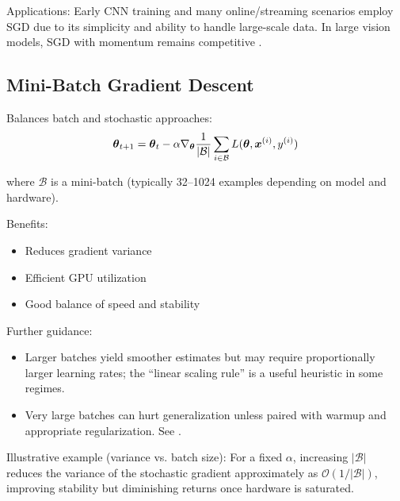 Applications: Early CNN training and many online/streaming scenarios employ SGD due to its simplicity and ability to handle large-scale data. In large vision models, SGD with momentum remains competitive \cite{He2016}.

\subsection{Mini-Batch Gradient Descent}

Balances batch and stochastic approaches:
\begin{equation}
\boldsymbol{\theta}_{t+1} = \boldsymbol{\theta}_t - \alpha \nabla_{\boldsymbol{\theta}} \frac{1}{|\mathcal{B}|} \sum_{i \in \mathcal{B}} L(\boldsymbol{\theta}, \boldsymbol{x}^{(i)}, y^{(i)})
\end{equation}

where $\mathcal{B}$ is a mini-batch (typically 32–1024 examples depending on model and hardware).

Benefits:
\begin{itemize}
    \item Reduces gradient variance
    \item Efficient GPU utilization
    \item Good balance of speed and stability
\end{itemize}

Further guidance:
\begin{itemize}
    \item Larger batches yield smoother estimates but may require proportionally larger learning rates; the ``linear scaling rule'' is a useful heuristic in some regimes.
    \item Very large batches can hurt generalization unless paired with warmup and appropriate regularization. See \cite{WebOptimizationDLBook,D2LChapterOptimization}.
\end{itemize}

Illustrative example (variance vs. batch size): For a fixed \(\alpha\), increasing \(|\mathcal{B}|\) reduces the variance of the stochastic gradient approximately as \(\mathcal{O}(1/|\mathcal{B}|)\), improving stability but diminishing returns once hardware is saturated.


